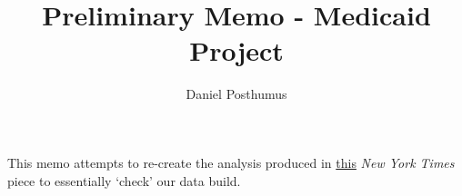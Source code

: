 \documentclass{article}
\begin{document}
\title{Preliminary Memo - Medicaid Project} 
\author{Daniel Posthumus}

\maketitle

This memo attempts to re-create the analysis produced in \href{https://www.nytimes.com/interactive/2025/02/27/us/politics/medicaid-enrollment.html}{this} \textit{New York Times} piece to essentially `check' our data build.
\end{document}
